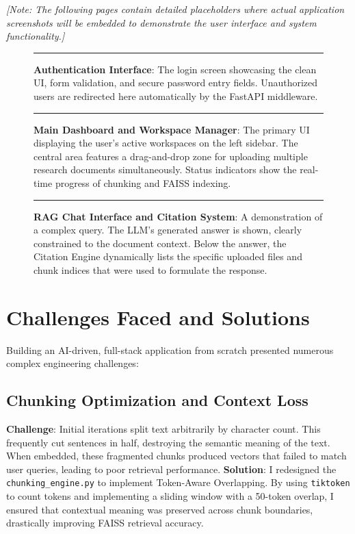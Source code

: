 \documentclass[12pt, a4paper]{report}
\begin{document}
\textit{[Note: The following pages contain detailed placeholders where actual application screenshots will be embedded to demonstrate the user interface and system functionality.]}

\vspace{1cm}
\begin{figure}[h]
    \centering
    \rule{0.9\textwidth}{0.5\textwidth}
    \caption{\textbf{Authentication Interface}: The login screen showcasing the clean UI, form validation, and secure password entry fields. Unauthorized users are redirected here automatically by the FastAPI middleware.}
\end{figure}

\vspace{1cm}
\begin{figure}[h]
    \centering
    \rule{0.9\textwidth}{0.5\textwidth}
    \caption{\textbf{Main Dashboard and Workspace Manager}: The primary UI displaying the user's active workspaces on the left sidebar. The central area features a drag-and-drop zone for uploading multiple research documents simultaneously. Status indicators show the real-time progress of chunking and FAISS indexing.}
\end{figure}

\vspace{1cm}
\begin{figure}[h]
    \centering
    \rule{0.9\textwidth}{0.5\textwidth}
    \caption{\textbf{RAG Chat Interface and Citation System}: A demonstration of a complex query. The LLM's generated answer is shown, clearly constrained to the document context. Below the answer, the Citation Engine dynamically lists the specific uploaded files and chunk indices that were used to formulate the response.}
\end{figure}


\chapter{Challenges Faced and Solutions}

Building an AI-driven, full-stack application from scratch presented numerous complex engineering challenges:

\section{Chunking Optimization and Context Loss}
\textbf{Challenge}: Initial iterations split text arbitrarily by character count. This frequently cut sentences in half, destroying the semantic meaning of the text. When embedded, these fragmented chunks produced vectors that failed to match user queries, leading to poor retrieval performance.
\textbf{Solution}: I redesigned the \texttt{chunking\_engine.py} to implement Token-Aware Overlapping. By using \texttt{tiktoken} to count tokens and implementing a sliding window with a 50-token overlap, I ensured that contextual meaning was preserved across chunk boundaries, drastically improving FAISS retrieval accuracy.
\end{document}
